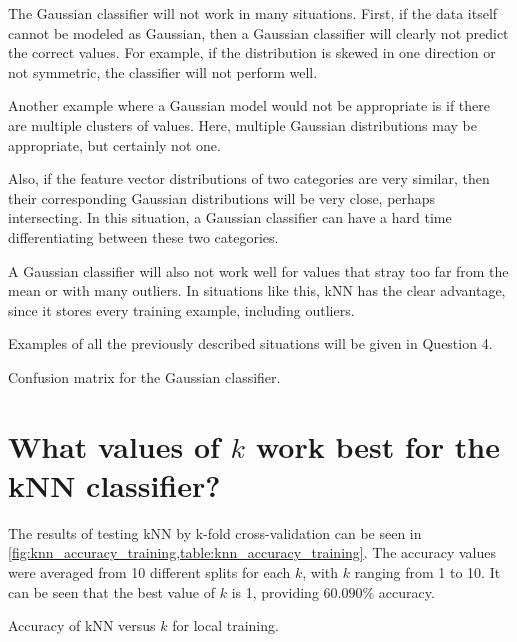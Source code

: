 \documentclass[a4paper,titlepage]{article}
\begin{document}
	The Gaussian classifier will not work in many situations. First, if the data itself cannot be modeled as Gaussian, then a Gaussian classifier will clearly not predict the correct values. For example, if the distribution is skewed in one direction or not symmetric, the classifier will not perform well.
	
	Another example where a Gaussian model would not be appropriate is if there are multiple clusters of values. Here, multiple Gaussian distributions may be appropriate, but certainly not one.
	
	Also, if the feature vector distributions of two categories are very similar, then their corresponding Gaussian distributions will be very close, perhaps intersecting. In this situation, a Gaussian classifier can have a hard time differentiating between these two categories.
	
	A Gaussian classifier will also not work well for values that stray too far from the mean or with many outliers. In situations like this, kNN has the clear advantage, since it stores every training example, including outliers.

	Examples of all the previously described situations will be given in Question 4.

	\begin{table}[!htb]
	\centering
	\caption{Confusion matrix for the Gaussian classifier.}
	\label{table:confusion_gaussian}
	\end{table}
	
	\section{What values of $k$ work best for the kNN classifier?}

	The results of testing kNN by k-fold cross-validation can be seen in \cref{fig:knn_accuracy_training,table:knn_accuracy_training}. The accuracy values were averaged from 10 different splits for each $k$, with $k$ ranging from 1 to 10. It can be seen that the best value of $k$ is 1, providing $60.090\%$ accuracy.

	\begin{table}[!htb]
		\centering
		\caption{Accuracy of kNN versus $k$ for local training.}
		\label{table:knn_accuracy_training}
	\end{table}
	
\end{document}
